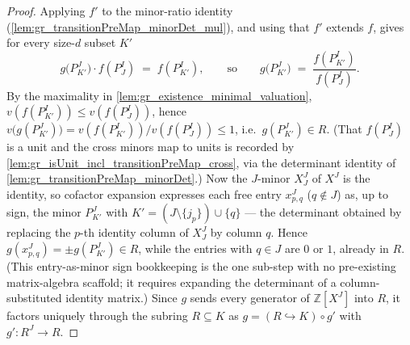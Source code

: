 \begin{proof}
    \leanok
  Applying \(f'\) to the minor-ratio identity
  (\cref{lem:gr_transitionPreMap_minorDet_mul}), and using that \(f'\) extends
  \(f\), gives for every size-\(d\) subset \(K'\)
  \[
    g\bigl(P^J_{K'}\bigr)\cdot f(P^I_J) \;=\; f(P^I_{K'}),
    \qquad\text{so}\qquad
    g\bigl(P^J_{K'}\bigr) \;=\; \frac{f(P^I_{K'})}{f(P^I_J)} .
  \]
  By the maximality in \cref{lem:gr_existence_minimal_valuation},
  \(v(f(P^I_{K'})) \le v(f(P^I_J))\), hence \(v\bigl(g(P^J_{K'})\bigr) =
  v(f(P^I_{K'}))/v(f(P^I_J)) \le 1\), i.e.\ \(g(P^J_{K'}) \in R\). (That
  \(f(P^I_J)\) is a unit and the cross minors map to units is recorded by
  \cref{lem:gr_isUnit_incl_transitionPreMap_cross}, via the determinant identity of
  \cref{lem:gr_transitionPreMap_minorDet}.) Now the \(J\)-minor \(X^J_J\) of \(X^J\)
  is the identity, so cofactor expansion expresses each free entry \(x^J_{p,q}\)
  (\(q \notin J\)) as, up to sign, the minor \(P^J_{K'}\) with \(K' = (J \setminus
  \{j_p\}) \cup \{q\}\) --- the determinant obtained by replacing the \(p\)-th
  identity column of \(X^J_J\) by column \(q\). Hence \(g(x^J_{p,q}) = \pm
  g(P^J_{K'}) \in R\), while the entries with \(q \in J\) are \(0\) or \(1\),
  already in \(R\). (This entry-as-minor sign bookkeeping is the one sub-step with
  no pre-existing matrix-algebra scaffold; it requires expanding the determinant of
  a column-substituted identity matrix.) Since \(g\) sends every generator of
  \(\mathbb{Z}[X^J]\) into \(R\), it factors uniquely through the subring \(R
  \subseteq K\) as \(g = (R \hookrightarrow K) \circ g'\) with \(g' : R^J \to R\).
\end{proof}



